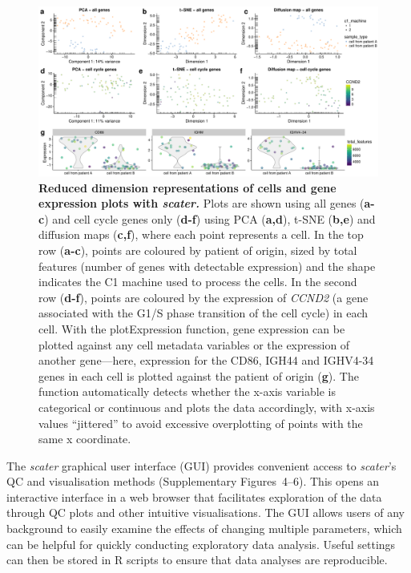 \documentclass{bioinfo}
\begin{document}
\begin{figure}[!htpb]%
\centerline{\includegraphics[width=\textwidth]{figures/figure4.pdf}}
\caption{\textbf{Reduced dimension representations of cells and gene expression plots with \emph{scater.}} Plots are shown using all genes (\textbf{a-c}) and cell cycle genes only (\textbf{d-f}) using PCA (\textbf{a,d}), t-SNE (\textbf{b,e}) and diffusion maps (\textbf{c,f}), where each point represents a cell. In the top row (\textbf{a-c}), points are coloured by patient of origin, sized by total features (number of genes with detectable expression) and the shape indicates the C1 machine used to process the cells. In the second row (\textbf{d-f}), points are coloured by the expression of \emph{CCND2} (a gene associated with the G1/S phase transition of the cell cycle) in each cell. With the plotExpression function, gene expression can be plotted against any cell metadata variables or the expression of another gene---here, expression for the CD86, IGH44 and IGHV4-34 genes in each cell is plotted against the patient of origin (\textbf{g}). The function automatically detects whether the x-axis variable is categorical or continuous and plots the data accordingly, with x-axis values ``jittered'' to avoid excessive overplotting of points with the same x coordinate.}\label{fig:04}
\end{figure}


The \emph{scater} graphical user interface (GUI) provides convenient
access to \emph{scater}'s QC and visualisation methods (Supplementary
Figures~4--6). This opens an interactive interface in a web browser that facilitates exploration of the data through QC plots and other intuitive visualisations. The GUI allows users of any background to easily examine the effects of changing multiple parameters, which can be helpful for quickly conducting exploratory data analysis. Useful settings can then be stored in R scripts to ensure that data analyses are reproducible.
\end{document}
